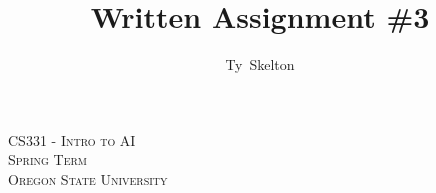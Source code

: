 \documentclass[10pt,draftclsnofoot,onecolumn]{IEEEtran}
\begin{document}
\singlespacing %
\title{Written Assignment \#3}

\author{Ty~Skelton}

\maketitle

\begin{center}
\scshape                      %
CS331 - Intro to AI \\        %
Spring Term\\[\baselineskip]  %
Oregon State University\par   %
\end{center}

\IEEEpeerreviewmaketitle

\newpage
{}
\end{document}
